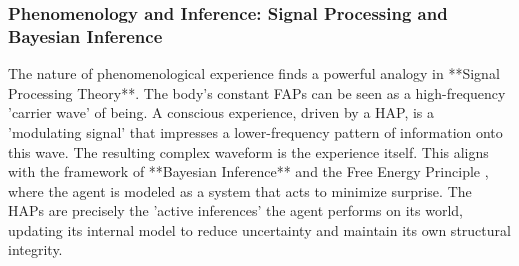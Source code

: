 \subsubsection{Phenomenology and Inference: Signal Processing and Bayesian Inference}
\label{ssubsec:formal_phenomenology}
The nature of phenomenological experience finds a powerful analogy in **Signal Processing Theory**. The body's constant FAPs can be seen as a high-frequency 'carrier wave' of being. A conscious experience, driven by a HAP, is a 'modulating signal' that impresses a lower-frequency pattern of information onto this wave. The resulting complex waveform is the experience itself. This aligns with the framework of **Bayesian Inference** and the Free Energy Principle \cite{friston2010free}, where the agent is modeled as a system that acts to minimize surprise. The HAPs are precisely the 'active inferences' the agent performs on its world, updating its internal model to reduce uncertainty and maintain its own structural integrity.